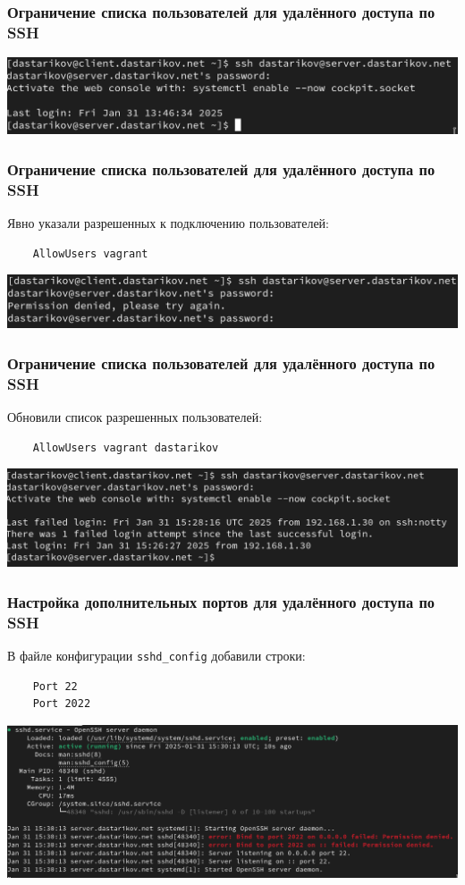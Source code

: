 \begin{frame}
\frametitle{Ограничение списка пользователей для удалённого доступа по SSH}
  \centering
  \includegraphics[width=\textwidth]{../images/image03.png}
\end{frame}

\begin{frame}[fragile]
\frametitle{Ограничение списка пользователей для удалённого доступа по SSH}
Явно указали разрешенных к подключению пользователей:
  \begin{verbatim}
    AllowUsers vagrant
  \end{verbatim}
  \centering
  \includegraphics[width=\textwidth]{../images/image04.png}
\end{frame}

\begin{frame}[fragile]
\frametitle{Ограничение списка пользователей для удалённого доступа по SSH}
Обновили список разрешенных пользователей:
  \begin{verbatim}
    AllowUsers vagrant dastarikov
  \end{verbatim}
  \centering
  \includegraphics[width=\textwidth]{../images/image05.png}
\end{frame}

\begin{frame}[fragile]
\frametitle{Настройка дополнительных портов для удалённого доступа по SSH}
В файле конфигурации \texttt{sshd\_config} добавили строки:
  \begin{verbatim}
    Port 22
    Port 2022
  \end{verbatim}
  \centering
  \includegraphics[width=\textwidth]{../images/image06.png}
\end{frame}

